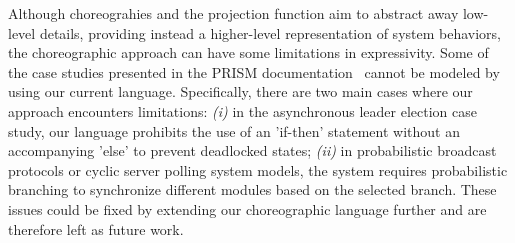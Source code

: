 Although choreograhies and the projection function aim to abstract
away low-level details, providing instead a higher-level
representation of system behaviors,
the choreographic approach can have some limitations in
expressivity. Some of the case studies presented in the PRISM
documentation~\cite{PRISMdoc} cannot be modeled by using our current
language. Specifically, there are two main cases where our approach
encounters limitations:
%
\textit{(i)} in the asynchronous leader election case study, our
language prohibits the use of an 'if-then' statement without an
accompanying 'else' to prevent deadlocked states;
%
\textit{(ii)} in probabilistic broadcast protocols or cyclic server
polling system models, the system requires probabilistic branching to
synchronize different modules based on the selected branch.
%
These issues could be fixed by extending our choreographic language
further and are therefore left as future work.

